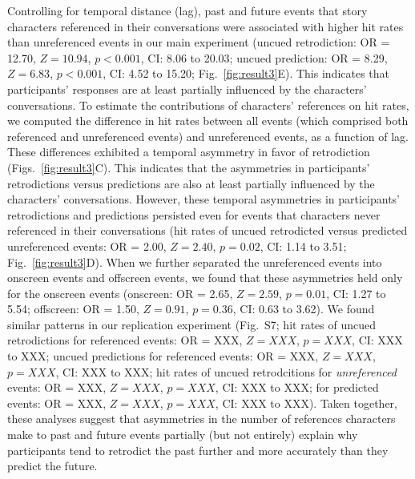 \documentclass[10pt]{article}
\newcommand{\characterRefs}{S7}
\begin{document}
Controlling for temporal distance (lag), past and future events that story
characters referenced in their conversations were associated with higher hit
rates than unreferenced events in our main experiment (uncued retrodiction: OR
= 12.70, $Z = 10.94$, $p < 0.001$, CI: 8.06 to 20.03; uncued prediction: OR =
8.29, $Z = 6.83$, $p < 0.001$, CI: 4.52 to 15.20; Fig.~\ref{fig:result3}E).
This indicates that participants' responses are at least partially influenced
by the characters' conversations. To estimate the contributions of characters’
references on hit rates, we computed the difference in hit rates between all
events (which comprised both referenced and unreferenced events) and
unreferenced events, as a function of lag. These differences exhibited a
temporal asymmetry in favor of retrodiction (Figs.~\ref{fig:result3}C). This
indicates that the asymmetries in participants' retrodictions versus
predictions are also at least partially influenced by the characters'
conversations. However, these temporal asymmetries in participants'
retrodictions and predictions persisted even for events that characters never
referenced in their conversations (hit rates of uncued retrodicted versus
predicted unreferenced events: OR = 2.00, $Z = 2.40$, $p = 0.02$, CI: 1.14 to
3.51; Fig.~\ref{fig:result3}D). When we further separated the unreferenced
events into onscreen events and offscreen events, we found that these
asymmetries held only for the onscreen events (onscreen: OR = 2.65, $Z = 2.59$,
$p = 0.01$, CI: 1.27 to 5.54; offscreen: OR = 1.50, $Z = 0.91$, $p = 0.36$, CI:
0.63 to 3.62). We found similar patterns in our replication experiment
(Fig.~\characterRefs; hit rates of uncued retrodictions for referenced events:
OR = XXX, $Z = XXX$, $p = XXX$, CI: XXX to XXX; uncued predictions for
referenced events: OR = XXX, $Z = XXX$, $p = XXX$, CI: XXX to XXX; hit rates of
uncued retrodcitions for \textit{unreferenced} events: OR = XXX, $Z = XXX$, $p
= XXX$, CI: XXX to XXX; for predicted events: OR = XXX, $Z = XXX$, $p = XXX$,
CI: XXX to XXX). Taken together, these analyses suggest that asymmetries in the
number of references characters make to past and future events partially (but
not entirely) explain why participants tend to retrodict the past further and
more accurately than they predict the future.
\end{document}
